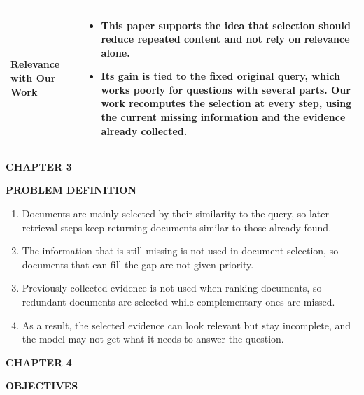 \documentclass[12pt,a4paper]{report}
\newcommand{\chaptertitle}[2]{
    \begin{flushright}
        {\fontsize{22}{26}\selectfont\bfseries CHAPTER #1\par}
        \vspace{0.10in}
        {\fontsize{22}{26}\selectfont\bfseries #2\par}
    \end{flushright}
    \vspace{0.12in}
}
\begin{document}
\begin{longtable}{|p{1.25in}|p{5.15in}|}
\textbf{Relevance with Our Work} &
\begin{itemize}[leftmargin=0.18in,itemsep=0.05in,topsep=0pt,parsep=0pt]
\item This paper supports the idea that selection should reduce repeated content and not rely on relevance alone.
\item Its gain is tied to the fixed original query, which works poorly for questions with several parts. Our work recomputes the selection at every step, using the current missing information and the evidence already collected.
\end{itemize} \\ \hline

\end{longtable}
\label{ch:2:end}
\clearpage




\chaptertitle{3}{PROBLEM DEFINITION}
\label{ch:3}
\justifying

\begin{enumerate}[leftmargin=0.30in,itemsep=0.12in,parsep=0pt]
\item
Documents are mainly selected by their similarity to the query, so later retrieval steps keep returning documents similar to those already found.

\item
The information that is still missing is not used in document selection, so documents that can fill the gap are not given priority.

\item
Previously collected evidence is not used when ranking documents, so redundant documents are selected while complementary ones are missed.

\item
As a result, the selected evidence can look relevant but stay incomplete, and the model may not get what it needs to answer the question.

\end{enumerate}
\clearpage





\chaptertitle{4}{OBJECTIVES}
\label{ch:4}
\justifying
\end{document}
